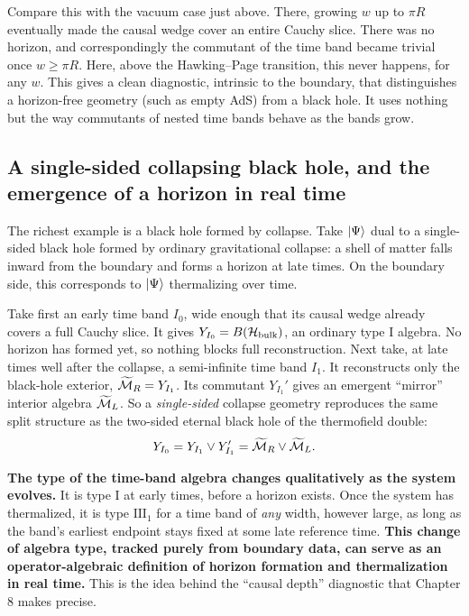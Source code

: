 Compare this with the vacuum case just above. There, growing $w$ up to $\pi R$ eventually made the causal wedge
cover an entire Cauchy slice. There was no horizon, and correspondingly the commutant of the time band became
trivial once $w\ge\pi R$. Here, above the Hawking--Page transition, this never happens, for any $w$. This gives a
clean diagnostic, intrinsic to the boundary, that distinguishes a horizon-free geometry (such as empty AdS) from
a black hole. It uses nothing but the way commutants of nested time bands behave as the bands grow.

\subsection*{A single-sided collapsing black hole, and the emergence of a horizon in real time}

The richest example is a black hole formed by collapse. Take $\ket\Psi$ dual to a single-sided black hole
formed by ordinary gravitational collapse: a shell of matter falls inward from the boundary and forms a horizon
at late times. On the boundary side, this corresponds to $\ket\Psi$ thermalizing over time.

Take first an early time band $I_0$, wide enough that its causal wedge already covers a full Cauchy slice. It
gives $Y_{I_0}=B(\mathcal{H}_{\text{bulk}})$, an ordinary type I algebra. No horizon has formed yet, so nothing blocks
full reconstruction. Next take, at late times well after the collapse, a semi-infinite time band $I_1$. It
reconstructs only the black-hole exterior, $\widetilde{\mathcal{M}}_R=Y_{I_1}$. Its commutant $Y_{I_1}'$ gives an emergent
``mirror'' interior algebra $\widetilde{\mathcal{M}}_L$. So a \emph{single-sided} collapse geometry reproduces the same
split structure as the two-sided eternal black hole of the thermofield double:
\[
Y_{I_0}=Y_{I_1}\vee Y_{I_1}'=\widetilde{\mathcal{M}}_R\vee\widetilde{\mathcal{M}}_L .
\]

\textbf{The type of the time-band algebra changes qualitatively as the system evolves.} It is type I at early
times, before a horizon exists. Once the system has thermalized, it is type $\mathrm{III}_1$ for a time band of
\emph{any} width, however large, as long as the band's earliest endpoint stays fixed at some late reference time.
\textbf{This change of algebra type, tracked purely from boundary data, can serve as an operator-algebraic
definition of horizon formation and thermalization in real time.} This is the idea behind the ``causal depth''
diagnostic that Chapter 8 makes precise.

